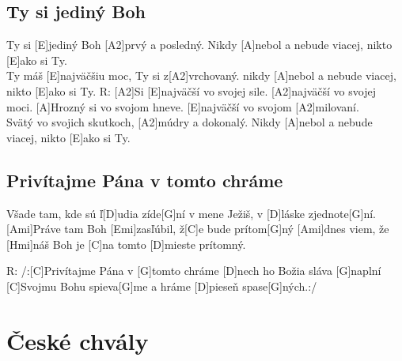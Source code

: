 \documentclass[10pt]{article}
\begin{document}
\begin{Large}
\begin{minipage}{\textwidth}
\subsection{Ty si jediný Boh}
\begin{multicols*}{2}
\begin{guitar}	
	Ty si [E]jediný Boh
	[A2]prvý a posledný.
	Nikdy [A]nebol a nebude viacej,
	nikto [E]ako si Ty.
	\\
	[A2]Ty máš [E]najväčšiu moc,
	Ty si z[A2]vrchovaný.
	nikdy [A]nebol a nebude viacej,
	nikto [E]ako si Ty.
	\columnbreak
	R:
	[A2]Si [E]najväčší vo svojej sile.
	[A2]najväčší vo svojej moci.
	[A]Hrozný si vo svojom hneve.
	[E]najväčší vo svojom [A2]milovaní.
	\\
	[E]Svätý vo svojich skutkoch,
	[A2]múdry a dokonalý.
	Nikdy [A]nebol a nebude viacej,
	nikto [E]ako si Ty.
\end{guitar}
\end{multicols*}
\end{minipage}

\begin{minipage}{\textwidth}
\subsection{Privítajme Pána v tomto chráme}
\begin{multicols*}{2}
\begin{guitar}	
	[G]Všade tam, kde sú ľ[D]udia zíde[G]ní
	v mene Ježiš, v [D]láske zjednote[G]ní.
	[Ami]Práve tam Boh [Emi]zasľúbil, ž[C]e bude prítom[G]ný
	[Ami]dnes viem, že [Hmi]náš Boh je 
	[C]na tomto [D]mieste prítomný.
	
	R: /:[C]Privítajme Pána v [G]tomto chráme
	[D]nech ho Božia sláva [G]naplní
	[C]Svojmu Bohu spieva[G]me a hráme
	[D]pieseň spase[G]ných.:/
\end{guitar}
\end{multicols*}
\end{minipage}

\newpage

\begin{minipage}{\textwidth}
\section{České chvály}

\end{minipage}
\end{Large}
\end{document}
